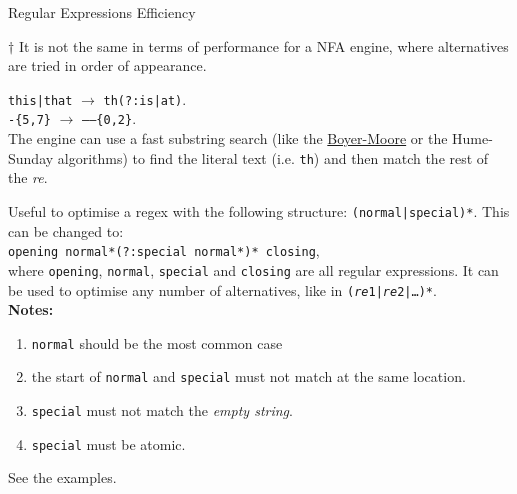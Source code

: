 \documentclass[11pt, a4paper, landscape]{scrartcl}
\newcommand{\regex}[1]{\texttt{#1}}
\newcommand{\cregex}[1]{\colorbox{gray!30}{\regex{#1}}}
\newcommand{\re}{\textit{re}}
\begin{document}
\begin{cheatsheet}{Regular Expressions Efficiency}
\begin{col2}
\begin{cheatnote}
$\dagger$ It is not the same in terms of performance for a NFA engine, where
alternatives are tried in order of appearance.\\
\end{cheatnote}


\cregex{this|that} $\to$ \cregex{th(?:is|at)}.\\
\cregex{-\{5,7\}} $\to$ \cregex{------\{0,2\}}.\\
The engine can use a fast substring search (like the
\href{https://en.wikipedia.org/wiki/Boyer–Moore_string_search_algorithm}{Boyer-Moore}
or the Hume-Sunday algorithms) to find the literal text (i.e. \cregex{th}) and
then match the rest of the \re.

\end{col2}

\begin{col3}


Useful to optimise a regex with the following structure:
\cregex{(normal|special)*}. This can be changed to:\\
\cregex{opening normal*(?:special normal*)* closing},\\
where \regex{opening}, \regex{normal}, \regex{special} and \regex{closing} are
all regular expressions. It can be used to optimise any number of alternatives,
like in \cregex{(\re{}1|\re{}2|\dots)*}.\\

\textbf{Notes:}
\begin{enumerate}
	\item \regex{normal} should be the most common case
	\item the start of \regex{normal} and \regex{special} must not match at the
		same location.
	\item \regex{special} must not match the \emph{empty string}.
	\item \regex{special} must be atomic.
\end{enumerate}
See the examples.

\end{col3}

\end{cheatsheet}

\newpage
\end{document}
